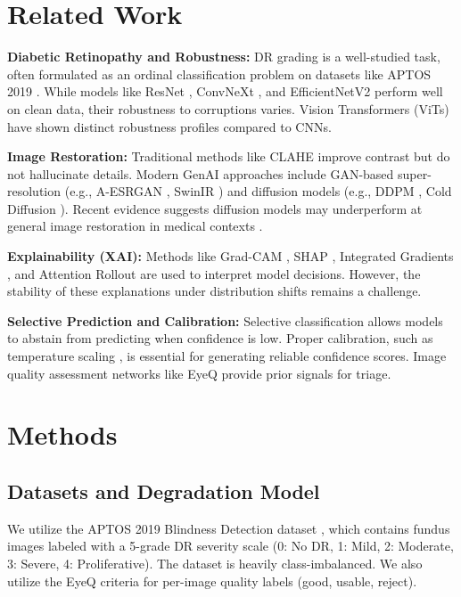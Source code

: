 \documentclass[conference]{IEEEtran}
\begin{document}
\section{Related Work}
\textbf{Diabetic Retinopathy and Robustness:} DR grading is a well-studied task, often formulated as an ordinal classification problem on datasets like APTOS 2019 \cite{aptos2019}. While models like ResNet \cite{he2016resnet}, ConvNeXt \cite{liu2022convnext}, and EfficientNetV2 \cite{tan2021efficientnetv2} perform well on clean data, their robustness to corruptions varies. Vision Transformers (ViTs) \cite{dosovitskiy2021vit, radford2021clip} have shown distinct robustness profiles compared to CNNs.

\textbf{Image Restoration:} Traditional methods like CLAHE \cite{pizer1987clahe} improve contrast but do not hallucinate details. Modern GenAI approaches include GAN-based super-resolution (e.g., A-ESRGAN \cite{wei2021aesrgan}, SwinIR \cite{liang2021swinir}) and diffusion models (e.g., DDPM \cite{ho2020ddpm}, Cold Diffusion \cite{bansal2022colddiffusion}). Recent evidence suggests diffusion models may underperform at general image restoration in medical contexts \cite{arxiv241209324}.

\textbf{Explainability (XAI):} Methods like Grad-CAM \cite{selvaraju2017gradcam}, SHAP \cite{lundberg2017shap}, Integrated Gradients \cite{sundararajan2017ig}, and Attention Rollout \cite{abnar2020rollout} are used to interpret model decisions. However, the stability of these explanations under distribution shifts remains a challenge.

\textbf{Selective Prediction and Calibration:} Selective classification \cite{geifman2017selective} allows models to abstain from predicting when confidence is low. Proper calibration, such as temperature scaling \cite{guo2017calibration}, is essential for generating reliable confidence scores. Image quality assessment networks like EyeQ \cite{fu2019eyeq} provide prior signals for triage.

\section{Methods}

\subsection{Datasets and Degradation Model}
We utilize the APTOS 2019 Blindness Detection dataset \cite{aptos2019}, which contains fundus images labeled with a 5-grade DR severity scale (0: No DR, 1: Mild, 2: Moderate, 3: Severe, 4: Proliferative). The dataset is heavily class-imbalanced. We also utilize the EyeQ \cite{fu2019eyeq} criteria for per-image quality labels (good, usable, reject).
\end{document}
